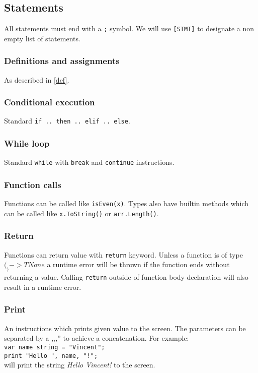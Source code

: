 \documentclass{article}
\begin{document}
\subsection{Statements}
All statements must end with a \texttt{;} symbol. We will use \texttt{[STMT]} to
designate a non empty list of statements.

\subsubsection{Definitions and assignments}
As described in \ref{def}.

\subsubsection{Conditional execution}
Standard \texttt{if .. then .. elif .. else}.

\subsubsection{While loop}
Standard \texttt{while} with \texttt{break} and \texttt{continue} instructions.

\subsubsection{Function calls}
Functions can be called like \texttt{isEven(x)}. Types also have builtin
methods which can be called like \texttt{x.ToString()} or \texttt{arr.Length()}.

\subsubsection{Return}
Functions can return value with \texttt{return} keyword. Unless a function is
of type $(_) -> TNone$ a runtime error will be thrown if the function ends
without returning a value. Calling \texttt{return} outside of function body
declaration will also result in a runtime error.

\subsubsection{Print}
An instructions which prints given value to the screen. The parameters can be
separated by a ,,\textit{,}'' to achieve a concatenation. For example: \\
\texttt{var name string = "Vincent"; } \\
\texttt{print "Hello ", name, "!"; } \\
will print the string \textit{Hello Vincent!} to the screen.
\end{document}
